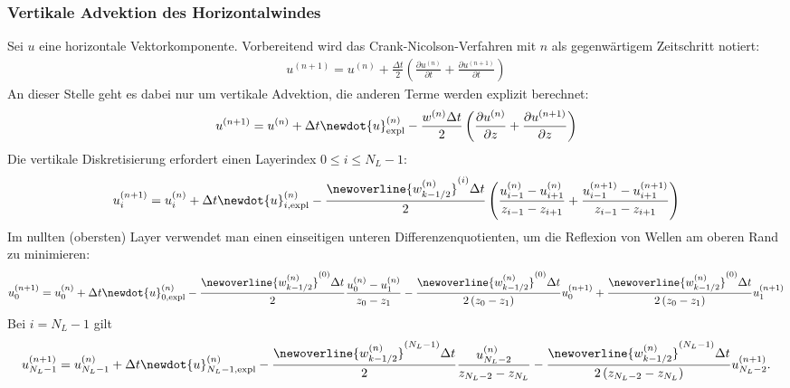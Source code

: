 \subsubsection{Vertikale Advektion des Horizontalwindes}
\label{sec:vertikale_advektion_des_horizontalwindes}

Sei $u$ eine horizontale Vektorkomponente. Vorbereitend wird das Crank-Nicolson-Verfahren mit $n$ als gegenwärtigem Zeitschritt notiert:
%
\begin{align}
u^{(n + 1)} = u^{(n)} + \frac{\Delta t}{2}\left(\frac{\partial u^{(n)}}{\partial t} + \frac{\partial u^{(n + 1)}}{\partial t}\right)
\end{align}
%
An dieser Stelle geht es dabei nur um vertikale Advektion, die anderen Terme werden explizit berechnet:
%
\begin{align}
u^{(n + 1)} = u^{(n)} + \Delta t\newdot{u}^{(n)}_{\text{expl}} - \frac{w^{(n)}\Delta t}{2}\left(\frac{\partial u^{(n)}}{\partial z} + \frac{\partial u^{(n + 1)}}{\partial z}\right)
\end{align}
%
Die vertikale Diskretisierung erfordert einen Layerindex $0 \leq i \leq N_L - 1$:
%
\begin{align}
u^{(n + 1)}_{i} = u^{(n)}_{i} + \Delta t\newdot{u}^{(n)}_{i, \text{expl}} - \frac{\newoverline{w^{(n)}_{k - 1/2}}^{(i)}\Delta t}{2}\left(\frac{u^{(n)}_{i - 1} - u^{(n)}_{i + 1}}{z_{i - 1} - z_{i + 1}} + \frac{u^{(n + 1)}_{i - 1} - u^{(n + 1)}_{i + 1}}{z_{i - 1} - z_{i + 1}}\right)
\end{align}
%
Im nullten (obersten) Layer verwendet man einen einseitigen unteren Differenzenquotienten, um die Reflexion von Wellen am oberen Rand zu minimieren:
%
\begin{align}
u^{(n + 1)}_{0} = u^{(n)}_{0} + \Delta t\newdot{u}^{(n)}_{0, \text{expl}} - \frac{\newoverline{w^{(n)}_{k - 1/2}}^{(0)}\Delta t}{2}\frac{u^{(n)}_{0} - u^{(n)}_{1}}{z_{0} - z_{1}} - \frac{\newoverline{w^{(n)}_{k - 1/2}}^{(0)}\Delta t}{2\left(z_{0} - z_{1}\right)}u^{(n + 1)}_{0} + \frac{\newoverline{w^{(n)}_{k - 1/2}}^{(0)}\Delta t}{2\left(z_{0} - z_{1}\right)}u^{(n + 1)}_{1}
\end{align}
%
Bei $i = N_L - 1$ gilt
%
\begin{align}
u^{(n + 1)}_{N_L - 1} = u^{(n)}_{N_L - 1} + \Delta t\newdot{u}^{(n)}_{N_L - 1, \text{expl}} - \frac{\newoverline{w^{(n)}_{k - 1/2}}^{(N_L - 1)}\Delta t}{2}\frac{u^{(n)}_{N_L - 2}}{z_{N_L - 2} - z_{N_L}} - \frac{\newoverline{w^{(n)}_{k - 1/2}}^{(N_L - 1)}\Delta t}{2\left(z_{N_L - 2} - z_{N_L}\right)}u^{(n + 1)}_{N_L - 2}.
\end{align}
